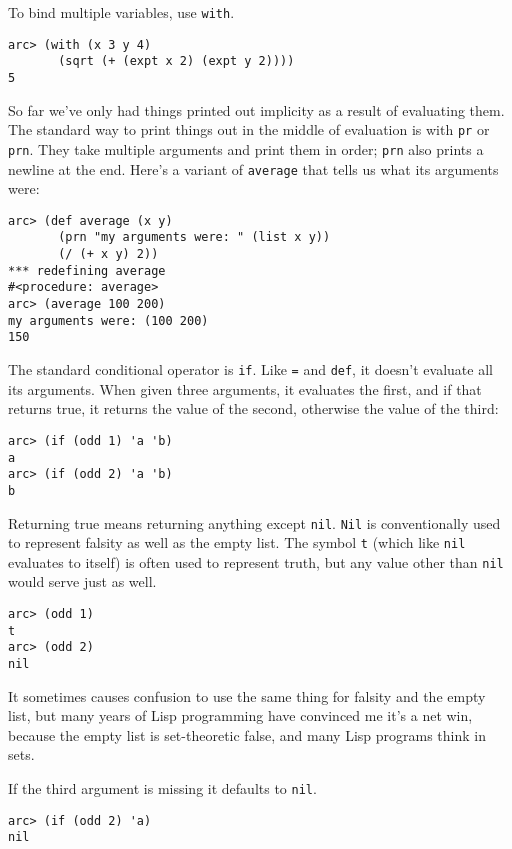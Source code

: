\documentclass[a4paper,12pt]{book}
\begin{document}
To bind multiple variables, use \verb|with|.

\begin{verbatim}
arc> (with (x 3 y 4)
       (sqrt (+ (expt x 2) (expt y 2))))
5
\end{verbatim}

So far we've only had things printed out implicity as a result of
evaluating them.  The standard way to print things out in the middle
of evaluation is with \verb|pr| or \verb|prn|.  They take multiple arguments and
print them in order; \verb|prn| also prints a newline at the end.  Here's
a variant of \verb|average| that tells us what its arguments were:

\begin{verbatim}
arc> (def average (x y)
       (prn "my arguments were: " (list x y))
       (/ (+ x y) 2))
*** redefining average
#<procedure: average>
arc> (average 100 200)
my arguments were: (100 200)
150
\end{verbatim}

The standard conditional operator is \verb|if|.  Like {\tt=} and \verb|def|, it doesn't
evaluate all its arguments.  When given three arguments, it evaluates
the first, and if that returns true, it returns the value of the
second, otherwise the value of the third:

\begin{verbatim}
arc> (if (odd 1) 'a 'b)
a
arc> (if (odd 2) 'a 'b)
b
\end{verbatim}

Returning true means returning anything except \verb|nil|.  \verb|Nil| is
conventionally used to represent falsity as well as the empty list.
The symbol {\tt{}t} (which like \verb|nil| evaluates to itself) is often used to
represent truth, but any value other than \verb|nil| would serve just as
well.

\begin{verbatim}
arc> (odd 1)
t
arc> (odd 2)
nil
\end{verbatim}

It sometimes causes confusion to use the same thing for falsity and
the empty list, but many years of {\sc{}Lisp} programming have convinced
me it's a net win, because the empty list is set-theoretic false,
and many {\sc{}Lisp} programs think in sets.

If the third argument is missing it defaults to \verb|nil|.

\begin{verbatim}
arc> (if (odd 2) 'a)
nil
\end{verbatim}
\end{document}
